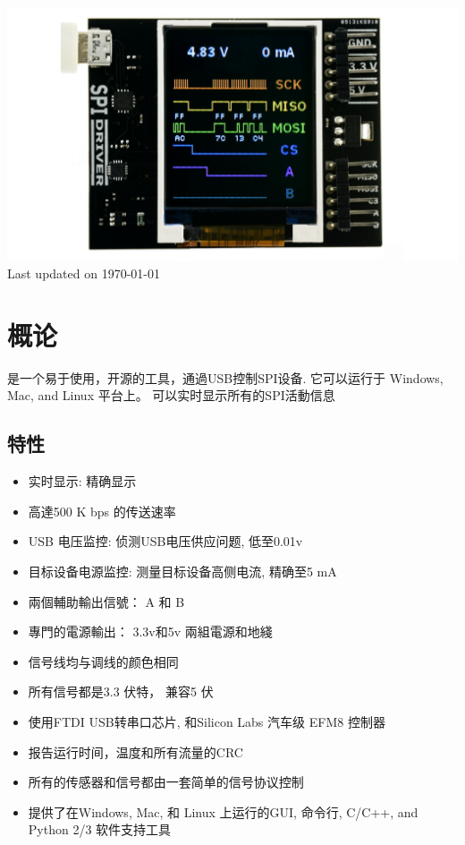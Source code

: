 \documentclass{article}
\begin{document}
\newpage
\begin{center}
\includegraphics[width=1.00\textwidth]{img/spidriver/main}
Last updated on \today
\end{center}
\tableofcontents

\newpage

\setlength{\parindent}{0mm}
\setlength{\parskip}{1mm}

\section{概论}

是一个易于使用，开源的工具，通過USB控制SPI设备.
它可以运行于 Windows, Mac, and Linux 平台上。
可以实时显示所有的SPI活動信息

\subsection{特性}
\begin{itemize}
\item {实时显示}: 精确显示
\item 高達500 K bps 的传送速率
\item {USB 电压监控}: 侦测USB电压供应问题, 低至0.01v
\item {目标设备电源监控}: 测量目标设备高侧电流, 精确至5 mA  
\item 兩個輔助輸出信號： A 和 B
\item 專門的電源輸出： 3.3v和5v 兩組電源和地綫
\item 信号线均与调线的颜色相同
\item 所有信号都是3.3 伏特， 兼容5 伏
\item 使用FTDI USB转串口芯片, 和Silicon Labs 汽车级 EFM8 控制器
\item 报告运行时间，温度和所有流量的CRC
\item 所有的传感器和信号都由一套简单的信号协议控制
\item 提供了在Windows, Mac, 和 Linux 上运行的GUI, 命令行, C/C++, and Python 2/3 软件支持工具 
\end{itemize}
\end{document}
